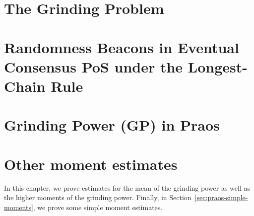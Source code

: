 


\chapter{The Grinding Problem}\label{sec:grinding-intro}


\chapter{Randomness Beacons in Eventual Consensus PoS under the Longest-Chain Rule}\label{sec:model-grinding}


% 

\chapter{Grinding Power (GP) in Praos}\label{sec:praos}


% 




\chapter{Other moment estimates}\label{sec:praos-other-moments}
In this chapter, 
we prove estimates for the mean of the grinding power 
as well as the higher moments of the grinding power. 
Finally, in Section~\ref{sec:praos-simple-moments}, 
we prove some simple moment estimates.

